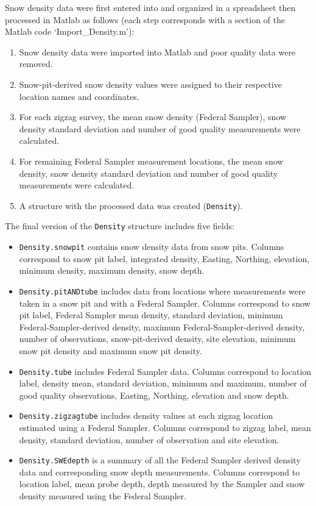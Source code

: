 \documentclass{sfuthesis}
\begin{document}
\begin{appendices}
Snow density data were first entered into and organized in a spreadsheet then processed in Matlab as follows (each step corresponds with a section of the Matlab code `Import\_Density.m'): 
\begin{enumerate}
\item Snow density data were imported into Matlab and poor quality data were removed. 
\item Snow-pit-derived snow density values were assigned to their respective location names and coordinates.
\item For each zigzag survey, the mean snow density (Federal Sampler), snow density standard deviation and number of good quality measurements were calculated.
\item For remaining Federal Sampler measurement locations, the mean snow density, snow density standard deviation and number of good quality measurements were calculated. 
\item A structure with the processed data was created (\texttt{Density}).
\end{enumerate}

The final version of the \texttt{Density} structure includes five fields:
\begin{itemize}
\item[]\texttt{Density.snowpit} contains snow density data from snow pits. Columns correspond to snow pit label, integrated density, Easting, Northing, elevation, minimum density, maximum density, snow depth.
\item[]\texttt{Density.pitANDtube} includes data from locations where measurements were taken in a snow pit and with a Federal Sampler. Columns correspond to snow pit label, Federal  Sampler mean density, standard deviation, minimum Federal-Sampler-derived density, maximum Federal-Sampler-derived density, number of observations, snow-pit-derived density, site elevation, minimum snow pit density and maximum snow pit density.
\item[]\texttt{Density.tube} includes Federal Sampler data. Columns correspond to location label, density mean, standard deviation, minimum and maximum, number of good quality observations, Easting, Northing, elevation and snow depth. 
\item[]\texttt{Density.zigzagtube} includes density values at each zigzag location estimated using a Federal Sampler. Columns correspond to zigzag label, mean density, standard deviation, number of observation and site elevation. 
\item[]\texttt{Density.SWEdepth} is a summary of all the Federal Sampler derived density data and corresponding snow depth measurements. Columns correspond to location label, mean probe depth, depth measured by the Sampler and snow density measured using the Federal Sampler. 
\end{itemize}


\end{appendices}
\end{document}
